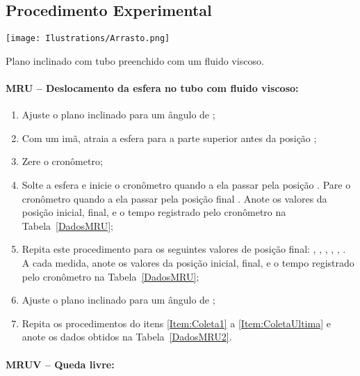 \subsection{Procedimento Experimental}

\begin{marginfigure}
\texttt{[image: Ilustrations/Arrasto.png]}
\caption{Plano inclinado com tubo preenchido com um fluido viscoso.}
\end{marginfigure}

\paragraph{MRU -- Deslocamento da esfera no tubo com fluido viscoso:}

\begin{enumerate}
	\item Ajuste o plano inclinado para um ângulo de ;
	\item Com um imã, atraia a esfera para a parte superior antes da posição ;\label{Item:Coleta1}
	\item Zere o cronômetro;
	\item Solte a esfera e inicie o cronômetro quando a ela passar pela posição . Pare o cronômetro quando a ela passar pela posição final . Anote os valores da posição inicial, final, e o tempo registrado pelo cronômetro na Tabela~\ref{DadosMRU};
	\item Repita este procedimento para os seguintes valores de posição final: , , , , , . A cada medida, anote os valores da posição inicial, final, e o tempo registrado pelo cronômetro na Tabela~\ref{DadosMRU};\label{Item:ColetaUltima}
	\item Ajuste o plano inclinado para um ângulo de ;
	\item Repita os procedimentos do itens \ref{Item:Coleta1} a \ref{Item:ColetaUltima} e anote os dados obtidos na Tabela~\ref{DadosMRU2}.
\end{enumerate}

\paragraph{MRUV -- Queda livre:}

